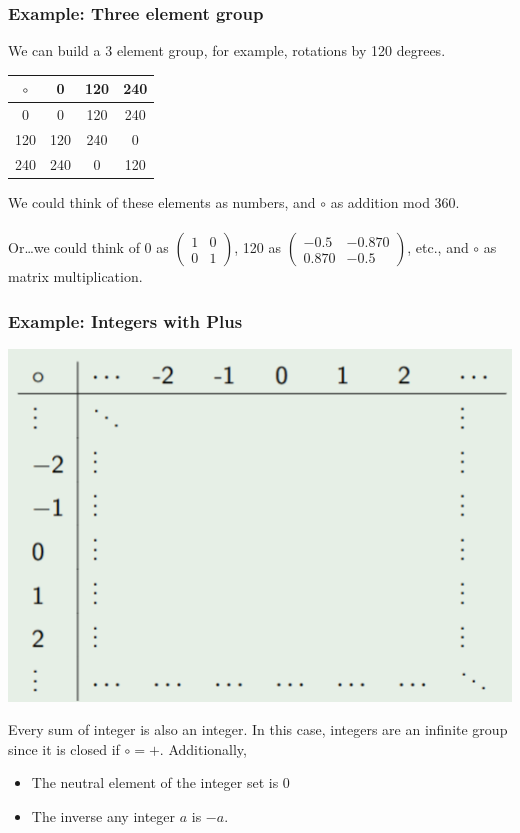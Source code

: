 \documentclass[10pt]{article}
\begin{document}
\subsubsection*{Example: Three element group}
We can build a 3 element group, for example, rotations by 120 degrees.
\begin{center}
    \begin{tabular}{c|ccc}
        $\circ$ & 0 & 120 & 240 \\ \hline
        0 & 0 & 120 & 240 \\
        120 & 120 & 240 & 0 \\
        240 & 240 & 0 & 120
        \end{tabular}
\end{center}
We could think of these elements as numbers, and $\circ$ as addition mod 360.\\\\
Or\dots we could think of 0 as $\begin{pmatrix}1 & 0 \\ 0 & 1\end{pmatrix}$, 120 as $\begin{pmatrix}-0.5 & -0.870 \\ 0.870 & -0.5\end{pmatrix}$, etc., and $\circ$ as matrix multiplication.

\subsubsection*{Example: Integers with Plus}
\begin{center}
    \includegraphics[scale=0.9]{W5_2.png}
\end{center}
Every sum of integer is also an integer.  In this case, integers are an infinite group since it is closed if $\circ = +$.  Additionally,
\begin{itemize}
    \item The neutral element of the integer set is 0
    \item The inverse any integer $a$ is $-a$.
\end{itemize}
\end{document}

